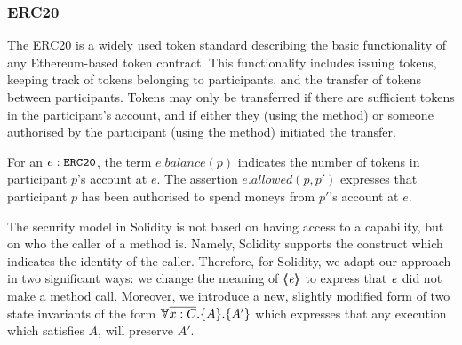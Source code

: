 %
%

\subsubsection{ERC20}

The ERC20 \cite{ERC20} is a widely used token standard describing the basic functionality of any Ethereum-based token 
contract. 
This functionality includes issuing tokens, keeping track of tokens belonging to participants, and the 
transfer of tokens between participants. Tokens may only be transferred if there are sufficient tokens in the 
participant's account, and if either they (using the  method) or someone authorised by the participant (using the  method) initiated the transfer. 

For an $e:\mbox{\normalfont{\texttt{ERC20}}}$, the term $e.balance(p)$  indicates the number of tokens in   participant $p$'s  account at $e$.
The 
assertion $e.allowed(p,p')$ expresses that participant $p$ has been authorised to spend moneys from $p'$'s account at $e$.
 
The security model in Solidity is not based on having access to a capability, but on who the caller of a method is. 
Namely, Solidity supports the  construct  which indicates the identity of the caller.
Therefore, for Solidity, we adapt our approach in two significant ways:
we change the meaning of $\langle\!\!\langle \mathit{e} \rangle\!\!\rangle$ to express that $\mathit{e}$ did not make a method call.
Moreover, we introduce a new, slightly modified form of two state invariants of the form $\TwoStates{\overline {x:C}}{A}{A'}$ which expresses that any execution which satisfies $A$, will preserve $A'$.

